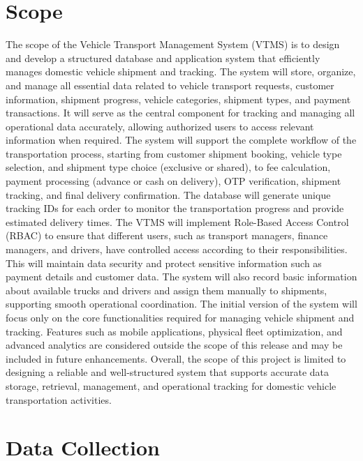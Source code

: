 \documentclass[12pt,a4paper]{article}
\begin{document}

\section{Scope}
The scope of the Vehicle Transport Management System (VTMS) is to design and develop a structured database and application system that efficiently manages domestic vehicle shipment and tracking. The system will store, organize, and manage all essential data related to vehicle transport requests, customer information, shipment progress, vehicle categories, shipment types, and payment transactions. It will serve as the central component for tracking and managing all operational data accurately, allowing authorized users to access relevant information when required.
The system will support the complete workflow of the transportation process, starting from customer shipment booking, vehicle type selection, and shipment type choice (exclusive or shared), to fee calculation, payment processing (advance or cash on delivery), OTP verification, shipment tracking, and final delivery confirmation. The database will generate unique tracking IDs for each order to monitor the transportation progress and provide estimated delivery times.
The VTMS will implement Role-Based Access Control (RBAC) to ensure that different users, such as transport managers, finance managers, and drivers, have controlled access according to their responsibilities. This will maintain data security and protect sensitive information such as payment details and customer data. The system will also record basic information about available trucks and drivers and assign them manually to shipments, supporting smooth operational coordination.
The initial version of the system will focus only on the core functionalities required for managing vehicle shipment and tracking. Features such as mobile applications, physical fleet optimization, and advanced analytics are considered outside the scope of this release and may be included in future enhancements.
Overall, the scope of this project is limited to designing a reliable and well-structured system that supports accurate data storage, retrieval, management, and operational tracking for domestic vehicle transportation activities.



\section{Data Collection}
\end{document}
